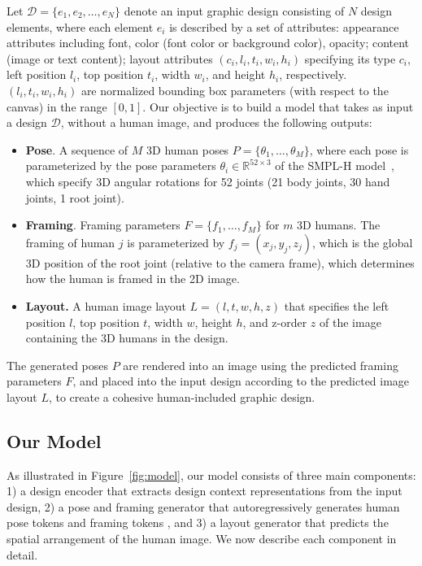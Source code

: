Let $\mathcal{D} = \{e_1, e_2, \ldots, e_N\}$ denote an input graphic design consisting of $N$ design elements, where each element $e_i$ is described by a set of attributes: appearance attributes including 
font, color (font color or background color),
opacity; content 
(image or text content); layout attributes
$(c_i, l_i, t_i, w_i, h_i)$ specifying its type $c_i$, 
left position $l_i$, top position $t_i$, width $w_i$, and height $h_i$, respectively. $(l_i, t_i, w_i, h_i)$ are normalized bounding box parameters (with respect to the canvas) in the range $[0, 1]$.
Our objective is to build a model that takes as input a design $\mathcal{D}$, without a human image, and produces the following outputs:
\begin{itemize}
    \item \textbf{Pose}. A sequence of $M$ 3D human poses $P = \{\theta_1, \ldots, \theta_M\}$, where each pose is parameterized by the pose parameters $\theta_i \in \mathbb{R}^{52 \times 3}$ of the SMPL-H model~\cite{smplh},
    which specify 3D angular rotations for 52 joints (21 body joints, 30 hand joints, 1 root joint).
    \item \textbf{Framing}. Framing parameters $F = \{f_1, \ldots, f_M\}$ for $m$ 3D humans. The framing of human $j$ is parameterized by $f_j = (x_j, y_j, z_j)$, which is the global 3D position of the root joint (relative to the camera frame), which determines how the human is framed in the 2D image. 
    \item \textbf{Layout.} A human image layout $L = (l, t, w, h, z)$ that specifies the left position $l$, top position $t$, width $w$, height $h$, and z-order $z$ of the image containing the 3D humans in the design.
\end{itemize}

The generated poses $P$ are rendered into an image using the predicted framing parameters $F$, and placed into the input design according to the predicted image layout $L$, to create a cohesive human-included graphic design. 

\subsection{Our Model}
\label{sec:architecture}

As illustrated in Figure~\ref{fig:model}, our model consists of three main components: 1) a design encoder that extracts design context representations
from the input design, 2) a pose and framing generator that autoregressively generates human pose tokens and framing tokens 
, and 3) a layout generator that predicts the spatial arrangement of the human image. We now describe each component in detail.

